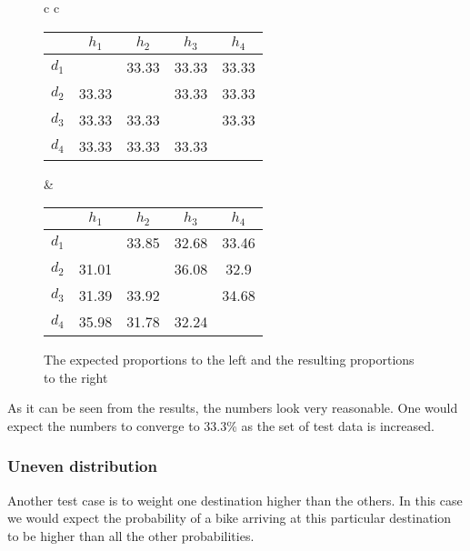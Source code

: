 \begin{figure}[p]
	\centering
	\begin{tabular} {c c }
		
		\begin{tabular}{ | c | c c c c |}
			\hline
			& $ h_1 $ & $ h_2 $ & $ h_3 $ & $ h_4 $\\
			\hline
			$ d_1 $ & $  $ & {\color{red}33.33} & {\color{red}33.33} & {\color{red}33.33}\\
			$ d_2 $ & {\color{blue}33.33} & $  $ & {\color{blue}33.33} & {\color{blue}33.33}\\
			$ d_3 $ & {\color{orange}33.33} & {\color{orange}33.33} & $  $ & {\color{orange}33.33}\\
			$ d_4 $ & {\color{purple}33.33} & {\color{purple}33.33} & {\color{purple}33.33} & $   $\\
			\hline
		\end{tabular}
		
		&
		
		\begin{tabular}{ | c | c c c c |}
			\hline
			& $ h_1 $ & $ h_2 $ & $ h_3 $ & $ h_4 $\\
			\hline
			$ d_1 $ & $  $ & {\color{red}33.85} & {\color{red}32.68} & {\color{red}33.46}\\
			$ d_2 $ & {\color{blue}31.01} & $  $ & {\color{blue}36.08} & {\color{blue}32.9}\\
			$ d_3 $ & {\color{orange}31.39} & {\color{orange}33.92} & $  $ & {\color{orange}34.68} \\
			$ d_4 $ & {\color{purple}35.98} & {\color{purple}31.78} & {\color{purple}32.24} & $   $\\
			\hline
		\end{tabular}
	\end{tabular}
	\caption{The expected proportions to the left and the resulting proportions to the right}\label{even_results}

\end{figure}

As it can be seen from the results, the numbers look very reasonable. One would expect the numbers to converge to 33.3\% as the set of test data is increased.

\subsubsection{Uneven distribution}
Another test case is to weight one destination higher than the others.
In this case we would expect the probability of a bike arriving at this particular destination to be higher than all the other probabilities.

